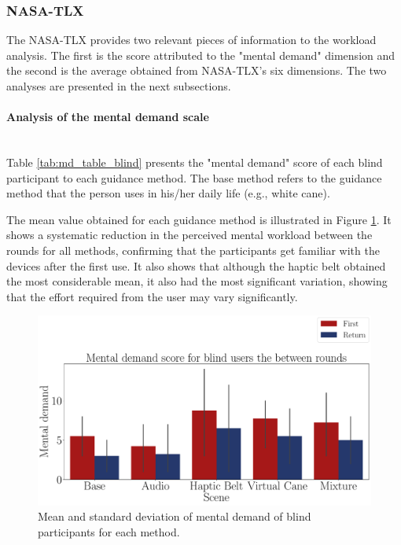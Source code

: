 \subsubsection{NASA-TLX}
\label{subsubsec:results_nasa_tlx_1}

The NASA-TLX provides two relevant pieces of information to the workload analysis. The first is the score attributed to the "mental demand" dimension and the second is the average obtained from NASA-TLX's six dimensions. The two analyses are presented in the next subsections.

\paragraph{Analysis of the mental demand scale}\mbox{}\\

Table \ref{tab:md_table_blind} presents the "mental demand" score of each blind participant to each guidance method. The base method refers to the guidance method that the person uses in his/her daily life (e.g., white cane). 



The mean value obtained for each guidance method is illustrated in Figure \ref{fig:barplot_md_avg_5_scene_blind}. It shows a systematic reduction in the perceived mental workload between the rounds for all methods, confirming that the participants get familiar with the devices after the first use. It also shows that although the haptic belt obtained the most considerable mean, it also had the most significant variation, showing that the effort required from the user may vary significantly.

\begin{figure}[!htb]
    \centering
    \includegraphics[width = \textwidth]{Resultados/Nasa/Figuras/pdf/barplot_md_avg_5_scene_blind.pdf}
    \caption{Mean and standard deviation of mental demand of blind participants for each method.}
    \label{fig:barplot_md_avg_5_scene_blind}
\end{figure}


